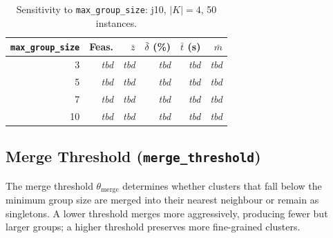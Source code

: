 \begin{table}[htbp]
\centering
\renewcommand{\arraystretch}{1.35}
\caption{Sensitivity to \texttt{max\_group\_size}:
         j10, $|K|=4$, 50 instances.}
\label{tab:sens_group_size}
\begin{tabular}{r r r r r r}
\hline
\texttt{max\_group\_size} &
\textbf{Feas.} &
$\bar{z}$ &
$\bar{\delta}$ (\%) &
$\bar{t}$ (s) &
$\bar{m}$ \\
\hline
3  & \textit{tbd} & \textit{tbd} & \textit{tbd}
   & \textit{tbd} & \textit{tbd} \\
5  & \textit{tbd} & \textit{tbd} & \textit{tbd}
   & \textit{tbd} & \textit{tbd} \\
7  & \textit{tbd} & \textit{tbd} & \textit{tbd}
   & \textit{tbd} & \textit{tbd} \\
10 & \textit{tbd} & \textit{tbd} & \textit{tbd}
   & \textit{tbd} & \textit{tbd} \\
\hline
\end{tabular}
\end{table}


\subsection{Merge Threshold
            (\texttt{merge\_threshold})}
\label{subsec:sens_merge}



The merge threshold $\theta_{\mathrm{merge}}$ determines
whether clusters that fall below the minimum group size are
merged into their nearest neighbour or remain as singletons.
A lower threshold merges more aggressively, producing fewer
but larger groups; a higher threshold preserves more
fine-grained clusters.

